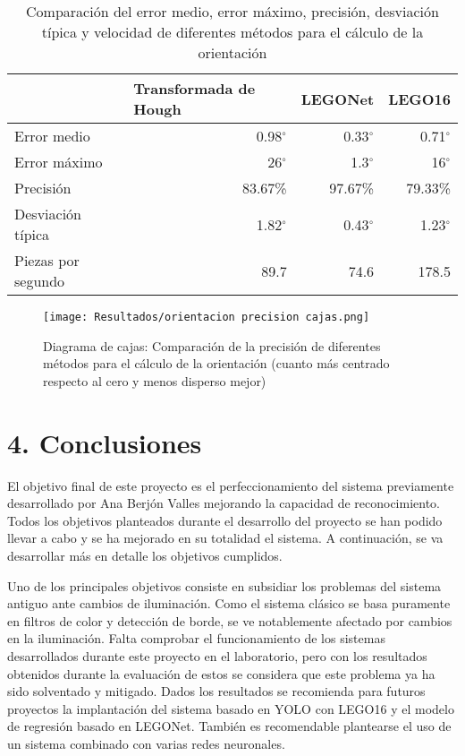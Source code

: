 {\begin{table}[ht] %
  \centering
    \begin{tabular}{|l|r|r|r|}
    \cline{2-4} \multicolumn{1}{r|}{} & \multicolumn{1}{l|}{Transformada de Hough} & \multicolumn{1}{l|}{LEGONet} & \multicolumn{1}{l|}{LEGO16}\\	
    \hline
    Error medio & 0.98$^{\circ}$  & 0.33$^{\circ}$ & 0.71$^{\circ}$ \\
    \hline
    Error máximo & 26$^{\circ}$  & 1.3$^{\circ}$ & 16$^{\circ}$ \\
    \hline
    Precisión & 83.67\% & 97.67\% & 79.33\% \\
    \hline
    Desviación típica & 1.82$^{\circ}$ & 0.43$^{\circ}$ & 1.23$^{\circ}$ \\
    \hline
    Piezas por segundo	&	89.7	&	74.6	&	178.5	\\
    \hline
    \end{tabular}%
  \label{tab:resm4}%
  \caption{Comparación del error medio, error máximo, precisión, desviación típica y velocidad de diferentes métodos para el cálculo de la orientación}
\end{table}

\begin{figure}[ht]  %
	\centering
	\texttt{[image: Resultados/orientacion precision cajas.png]}
	\caption{Diagrama de cajas: Comparación de la precisión de diferentes métodos para el cálculo de la orientación (cuanto más centrado respecto al cero y menos disperso mejor)}
	\label{fig:resm5}
\end{figure}

\section*{4. Conclusiones}
El objetivo final de este proyecto es el perfeccionamiento del sistema previamente desarrollado por Ana Berjón Valles \citep{TFGAna} mejorando la capacidad de reconocimiento. Todos los objetivos planteados durante el desarrollo del proyecto se han podido llevar a cabo y se ha mejorado en su totalidad el sistema. A continuación, se va desarrollar más en detalle los objetivos cumplidos.

Uno de los principales objetivos consiste en subsidiar los problemas del sistema antiguo ante cambios de iluminación. Como el sistema clásico se basa puramente en filtros de color y detección de borde, se ve notablemente afectado por cambios en la iluminación. Falta comprobar el funcionamiento de los sistemas desarrollados durante este proyecto en el laboratorio, pero con los resultados obtenidos durante la evaluación de estos se considera que este problema ya ha sido solventado y mitigado. Dados los resultados se recomienda para futuros proyectos la implantación del sistema basado en YOLO con LEGO16 y el modelo de regresión basado en LEGONet. También es recomendable plantearse el uso de un sistema combinado con varias redes neuronales.

}

